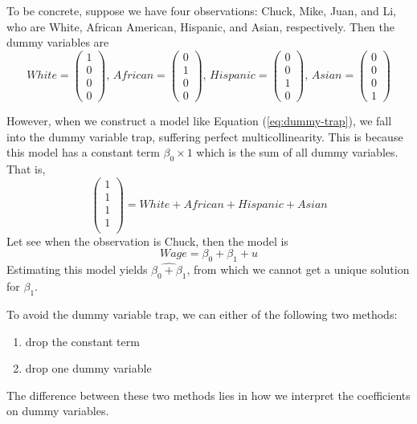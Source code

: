 \documentclass[a4paper,11pt]{article}
\begin{document}
To be concrete, suppose we have four observations: Chuck,
Mike, Juan, and Li, who are White, African American, Hispanic, and
Asian, respectively. Then the dummy variables are
\begin{equation*}
White =
\begin{pmatrix}
1 \\
0 \\
0 \\
0
\end{pmatrix},\,
African =
\begin{pmatrix}
0 \\
1 \\
0 \\
0
\end{pmatrix},\,
Hispanic =
\begin{pmatrix}
0 \\
0 \\
1 \\
0
\end{pmatrix},\,
Asian =
\begin{pmatrix}
0 \\
0 \\
0 \\
1
\end{pmatrix}
\end{equation*}

However, when we construct a model like Equation
(\ref{eq:dummy-trap}), we fall into the dummy variable trap, suffering
perfect multicollinearity. This is because this model has a constant
term \(\beta_0 \times 1\) which is the sum of all dummy variables. That
is,
\begin{equation*}
\begin{pmatrix}
1 \\
1 \\
1 \\
1 \\
\end{pmatrix}
= White + African + Hispanic + Asian
\end{equation*}
Let see when the observation is Chuck, then the model is
\[ Wage = \beta_0 + \beta_1 + u \]
Estimating this model yields \(\widehat{\beta_0 + \beta_1}\), from which
we cannot get a unique solution for \(\beta_1\).

To avoid the dummy variable trap, we can either of the following two
methods:
\begin{enumerate}
\item drop the constant term
\item drop one dummy variable
\end{enumerate}
The difference between these two methods lies in how we interpret the
coefficients on dummy variables.
\end{document}
